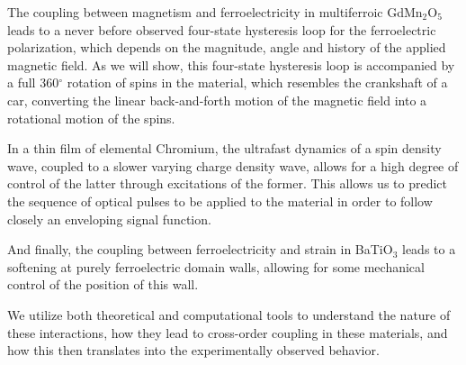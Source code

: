 \documentclass[12pt,a4paper,makeidx]{phdthesis}
\def\Include#1{%
        \def\ChapterPath{#1/}%
        \def\GraphicsPath{\ChapterPath Images/}%
        }
\begin{document}
The coupling between magnetism and ferroelectricity in multiferroic GdMn$_2$O$_5$ leads to a never before observed four-state hysteresis loop for the ferroelectric polarization, which depends on the magnitude, angle and history of the applied magnetic field.
As we will show, this four-state hysteresis loop is accompanied by a full 360$^\circ$ rotation of spins in the material, which resembles the crankshaft of a car, converting the linear back-and-forth motion of the magnetic field into a rotational motion of the spins.

In a thin film of elemental Chromium, the ultrafast dynamics of a spin density wave, coupled to a slower varying charge density wave, allows for a high degree of control of the latter through excitations of the former.
This allows us to predict the sequence of optical pulses to be applied to the material in order to follow closely an enveloping signal function.

And finally, the coupling between ferroelectricity and strain in BaTiO$_3$ leads to a softening at purely ferroelectric domain walls, allowing for some mechanical control of the position of this wall.

We utilize both theoretical and computational tools to understand the nature of these interactions, how they lead to cross-order coupling in these materials, and how this then translates into the experimentally observed behavior.
\tableofcontents

\Include{Introduction}
\Include{Theory}
\Include{Rashba}
\end{document}
